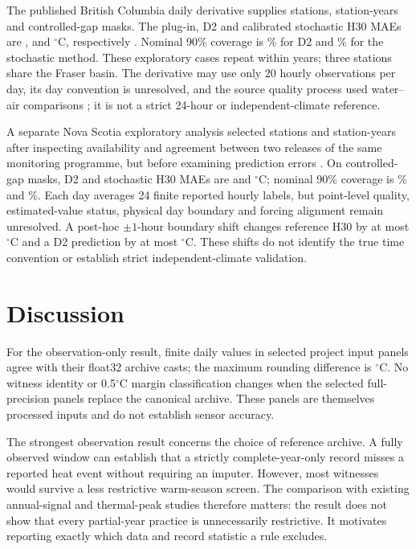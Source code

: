 \documentclass[draft,linenumbers]{agujournal2025}
\begin{document}
The published British Columbia daily derivative supplies \BCStations{} stations, \BCYears{} station-years and \BCCases{} controlled-gap masks. The plug-in, D2 and calibrated stochastic H30 MAEs are \BCPluginMAE{}, \BCDTwoMAE{} and \BCStochasticMAE{}$^{\circ}$C, respectively \cite{moore2024bc,callahan2025air2stream}. Nominal 90\% coverage is \BCDTwoCoverage\% for D2 and \BCStochasticCoverage\% for the stochastic method. These exploratory cases repeat within years; three stations share the Fraser basin. The derivative may use only 20 hourly observations per day, its day convention is unresolved, and the source quality process used water--air comparisons \cite{wsc_temperature_faq}; it is not a strict 24-hour or independent-climate reference.

A separate Nova Scotia exploratory analysis selected \NSExpStations{} stations and \NSExpYears{} station-years after inspecting availability and agreement between two releases of the same monitoring programme, but before examining prediction errors \cite{novascotiawater2026}. On \NSExpCases{} controlled-gap masks, D2 and stochastic H30 MAEs are \NSExpDTwoMAE{} and \NSExpClassicMAE{}$^{\circ}$C; nominal 90\% coverage is \NSExpDTwoCover\% and \NSExpClassicCover\%. Each day averages 24 finite reported hourly labels, but point-level quality, estimated-value status, physical day boundary and forcing alignment remain unresolved. A post-hoc $\pm1$-hour boundary shift changes reference H30 by at most \NSClockHMax{}$^{\circ}$C and a D2 prediction by at most \NSClockDTwoMax{}$^{\circ}$C. These shifts do not identify the true time convention or establish strict independent-climate validation.

\section{Discussion}
For the observation-only result, \IPDays{} finite daily values in \IPPanels{} selected project input panels agree with their float32 archive casts; the maximum rounding difference is \IPRounding{}$^{\circ}$C. No witness identity or 0.5$^{\circ}$C margin classification changes when the selected full-precision panels replace the canonical archive. These panels are themselves processed inputs and do not establish sensor accuracy.

The strongest observation result concerns the choice of reference archive. A fully observed window can establish that a strictly complete-year-only record misses a reported heat event without requiring an imputer. However, most witnesses would survive a less restrictive warm-season screen. The comparison with existing annual-signal and thermal-peak studies therefore matters: the result does not show that every partial-year practice is unnecessarily restrictive. It motivates reporting exactly which data and record statistic a rule excludes.
\end{document}
